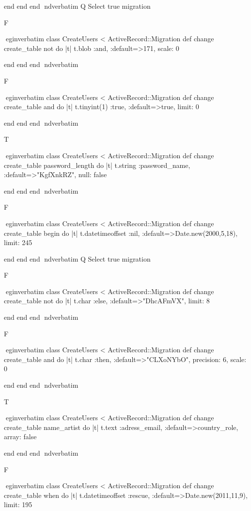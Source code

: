     end 
  end 
end
nd{verbatim}
Q
 Select true migration

F

egin{verbatim}
 class CreateUsers < ActiveRecord::Migration 
  def change 
    create_table not do |t| 
      t.blob :and, :default=>171, scale: 0
    
    end 
  end 
end
nd{verbatim}

F

egin{verbatim}
 class CreateUsers < ActiveRecord::Migration 
  def change 
    create_table and do |t| 
      t.tinyint(1) :true, :default=>true, limit: 0
    
    end 
  end 
end
nd{verbatim}

T

egin{verbatim}
 class CreateUsers < ActiveRecord::Migration 
  def change 
    create_table password_length do |t| 
      t.string :password_name, :default=>"KgfXnkRZ", null: false
    
    end 
  end 
end
nd{verbatim}

F

egin{verbatim}
 class CreateUsers < ActiveRecord::Migration 
  def change 
    create_table begin do |t| 
      t.datetimeoffset :nil, :default=>Date.new(2000,5,18), limit: 245
    
    end 
  end 
end
nd{verbatim}
Q
 Select true migration

F

egin{verbatim}
 class CreateUsers < ActiveRecord::Migration 
  def change 
    create_table not do |t| 
      t.char :else, :default=>"DhcAFmVX", limit: 8
    
    end 
  end 
end
nd{verbatim}

F

egin{verbatim}
 class CreateUsers < ActiveRecord::Migration 
  def change 
    create_table and do |t| 
      t.char :then, :default=>"CLXoNYbO", precision: 6, scale: 0
    
    end 
  end 
end
nd{verbatim}

T

egin{verbatim}
 class CreateUsers < ActiveRecord::Migration 
  def change 
    create_table name_artist do |t| 
      t.text :adress_email, :default=>country_role, array: false
    
    end 
  end 
end
nd{verbatim}

F

egin{verbatim}
 class CreateUsers < ActiveRecord::Migration 
  def change 
    create_table when do |t| 
      t.datetimeoffset :rescue, :default=>Date.new(2011,11,9), limit: 195
    
